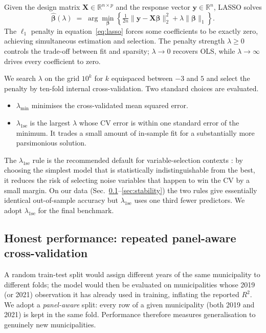 \documentclass[11pt,a4paper]{article}
\begin{document}
Given the design matrix
\(\mathbf{X} \in \mathbb{R}^{n \times p}\) and the response vector
\(\mathbf{y} \in \mathbb{R}^{n}\), LASSO solves
\begin{equation}
  \hat{\boldsymbol{\beta}}(\lambda) \;=\;
  \arg\min_{\boldsymbol{\beta}}
  \left\{
    \tfrac{1}{2n}
    \lVert \mathbf{y} - \mathbf{X}\boldsymbol{\beta} \rVert_{2}^{2}
    + \lambda \lVert \boldsymbol{\beta} \rVert_{1}
  \right\}.
  \label{eq:lasso}
\end{equation}
The \(\ell_{1}\) penalty in equation~\eqref{eq:lasso} forces some
coefficients to be exactly zero, achieving simultaneous estimation and
selection. The penalty strength \(\lambda \geq 0\) controls the
trade-off between fit and sparsity; \(\lambda \to 0\) recovers OLS,
while \(\lambda \to \infty\) drives every coefficient to zero.

We search \(\lambda\) on the grid \(10^{k}\) for \(k\) equispaced
between \(-3\) and \(5\) and select the penalty by ten-fold internal
cross-validation. Two standard choices are evaluated.
\begin{itemize}[leftmargin=2em]
  \item \(\lambda_{\min}\) minimises the cross-validated mean squared
    error.
  \item \(\lambda_{\mathrm{1se}}\) is the largest \(\lambda\) whose CV
    error is within one standard error of the minimum. It trades a
    small amount of in-sample fit for a substantially more parsimonious
    solution.
\end{itemize}
The \(\lambda_{\mathrm{1se}}\) rule is the recommended default for
variable-selection contexts \citep{hastieTF2009}: by choosing the
simplest model that is statistically indistinguishable from the best,
it reduces the risk of selecting noise variables that happen to win
the CV by a small margin. On our data
(Sec.~\ref{sec:perf}--\ref{sec:stability}) the two rules give
essentially identical out-of-sample accuracy but
\(\lambda_{\mathrm{1se}}\) uses one third fewer predictors. We adopt
\(\lambda_{\mathrm{1se}}\) for the final benchmark.

\subsection{Honest performance: repeated panel-aware cross-validation}
\label{sec:perf}

A random train-test split would assign different years of the same
municipality to different folds; the model would then be evaluated on
municipalities whose 2019 (or 2021) observation it has already used in
training, inflating the reported \(R^{2}\). We adopt a
\emph{panel-aware} split: every row of a given municipality (both 2019
and 2021) is kept in the same fold. Performance therefore measures
generalisation to genuinely new municipalities.
\end{document}
